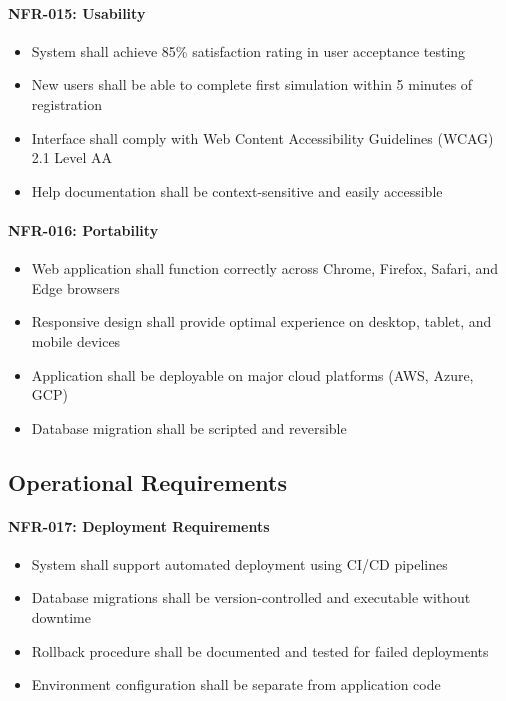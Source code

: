 \documentclass[12pt,a4paper]{article}
\begin{document}
\begin{enumerate}
\paragraph{NFR-015: Usability}
\begin{itemize}
    \item System shall achieve 85\% satisfaction rating in user acceptance testing
    \item New users shall be able to complete first simulation within 5 minutes of registration
    \item Interface shall comply with Web Content Accessibility Guidelines (WCAG) 2.1 Level AA
    \item Help documentation shall be context-sensitive and easily accessible
\end{itemize}

\paragraph{NFR-016: Portability}
\begin{itemize}
    \item Web application shall function correctly across Chrome, Firefox, Safari, and Edge browsers
    \item Responsive design shall provide optimal experience on desktop, tablet, and mobile devices
    \item Application shall be deployable on major cloud platforms (AWS, Azure, GCP)
    \item Database migration shall be scripted and reversible
\end{itemize}

\subsection{Operational Requirements}

\paragraph{NFR-017: Deployment Requirements}
\begin{itemize}
    \item System shall support automated deployment using CI/CD pipelines
    \item Database migrations shall be version-controlled and executable without downtime
    \item Rollback procedure shall be documented and tested for failed deployments
    \item Environment configuration shall be separate from application code
\end{itemize}


\end{enumerate}
\end{document}
